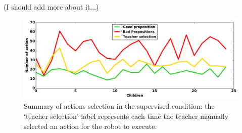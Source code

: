 (I should add more about it...)

\begin{figure}[ht]
	\includegraphics[width=1\linewidth]{./summary_supervision.pdf}
	\centering
	\caption{Summary of actions selection in the supervised condition: the `teacher selection' label represents each time the teacher manually selected an action for the robot to execute.}
	\label{fig:tutoring_supervision}
\end{figure}

